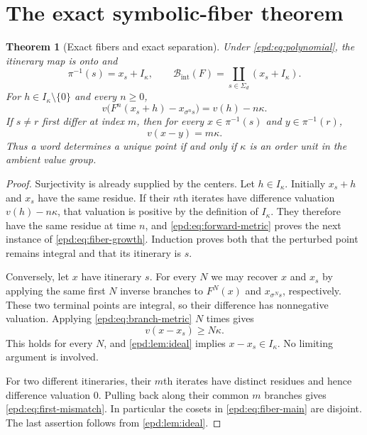 \documentclass[11pt,a4paper]{article}
\numberwithin{equation}{section}
\newtheorem{theorem}{Theorem}[section]
\theoremstyle{plain}
\theoremstyle{definition}
\theoremstyle{remark}
\newcommand{\Ik}{I_\kappa}
\newcommand{\BI}{\mathcal B_{\mathrm{int}}}
\newcommand{\Sig}{\Sigma_d}
\newcommand{\sh}{\sigma}
\begin{document}
\section{The exact symbolic-fiber theorem}
\label{epd:sec:fibers}
\begin{theorem}[Exact fibers and exact separation]\label{epd:thm:fibers}
Under \eqref{epd:eq:polynomial}, the itinerary map is onto and
\begin{equation}\label{epd:eq:fiber-main}
 \pi^{-1}(s)=x_s+\Ik,
 \qquad
 \BI(F)=\coprod_{s\in\Sig}(x_s+\Ik).
\end{equation}
For $h\in\Ik\setminus\{0\}$ and every $n\geq0$,
\begin{equation}\label{epd:eq:fiber-growth}
 v\bigl(F^n(x_s+h)-x_{\sh^n s}\bigr)=v(h)-n\kappa.
\end{equation}
If $s\ne r$ first differ at index $m$, then for every
$x\in\pi^{-1}(s)$ and $y\in\pi^{-1}(r)$,
\begin{equation}\label{epd:eq:first-mismatch}
 v(x-y)=m\kappa.
\end{equation}
Thus a word determines a unique point if and only if $\kappa$ is an
order unit in the ambient value group.
\end{theorem}
\begin{proof}
Surjectivity is already supplied by the centers. Let $h\in\Ik$.
Initially $x_s+h$ and $x_s$ have the same residue. If their $n$th
iterates have difference valuation $v(h)-n\kappa$, that valuation is
positive by the definition of $\Ik$. They therefore have the same
residue at time $n$, and \eqref{epd:eq:forward-metric} proves the next
instance of \eqref{epd:eq:fiber-growth}. Induction proves both that the
perturbed point remains integral and that its itinerary is $s$.

Conversely, let $x$ have itinerary $s$. For every $N$ we may recover
$x$ and $x_s$ by applying the same first $N$ inverse branches to
$F^N(x)$ and $x_{\sh^N s}$, respectively. These two terminal points are
integral, so their difference has nonnegative valuation. Applying
\eqref{epd:eq:branch-metric} $N$ times gives
\[
 v(x-x_s)\geq N\kappa.
\]
This holds for every $N$, and \cref{epd:lem:ideal} implies $x-x_s\in\Ik$.
No limiting argument is involved.

For two different itineraries, their $m$th iterates have distinct
residues and hence difference valuation $0$. Pulling back along their
common $m$ branches gives \eqref{epd:eq:first-mismatch}. In particular the
cosets in \eqref{epd:eq:fiber-main} are disjoint. The last assertion follows
from \cref{epd:lem:ideal}.
\end{proof}
\end{document}
